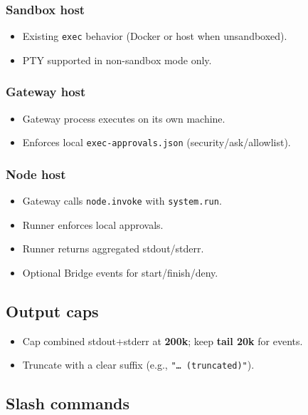 \subsubsection{Sandbox host}


\begin{itemize}
  \item Existing \texttt{exec} behavior (Docker or host when unsandboxed).
  \item PTY supported in non-sandbox mode only.
\end{itemize}


\subsubsection{Gateway host}


\begin{itemize}
  \item Gateway process executes on its own machine.
  \item Enforces local \texttt{exec-approvals.json} (security/ask/allowlist).
\end{itemize}


\subsubsection{Node host}


\begin{itemize}
  \item Gateway calls \texttt{node.invoke} with \texttt{system.run}.
  \item Runner enforces local approvals.
  \item Runner returns aggregated stdout/stderr.
  \item Optional Bridge events for start/finish/deny.
\end{itemize}


\subsection{Output caps}


\begin{itemize}
  \item Cap combined stdout+stderr at \textbf{200k}; keep \textbf{tail 20k} for events.
  \item Truncate with a clear suffix (e.g., \texttt{"… (truncated)"}).
\end{itemize}


\subsection{Slash commands}


